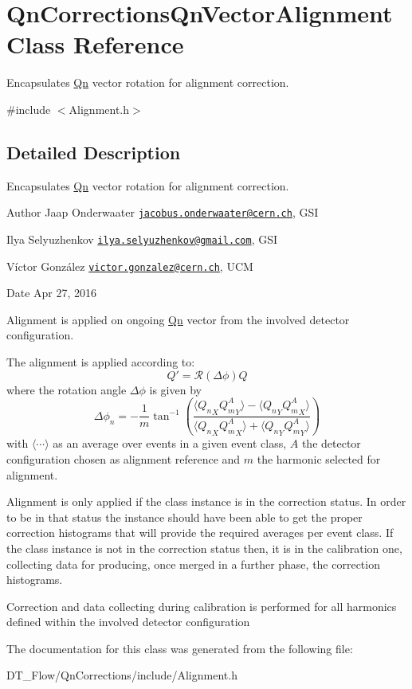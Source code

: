 \hypertarget{classQnCorrectionsQnVectorAlignment}{}\section{Qn\+Corrections\+Qn\+Vector\+Alignment Class Reference}
\label{classQnCorrectionsQnVectorAlignment}


Encapsulates \mbox{\hyperlink{namespaceQn}{Qn}} vector rotation for alignment correction.  




{\ttfamily \#include $<$Alignment.\+h$>$}



\subsection{Detailed Description}
Encapsulates \mbox{\hyperlink{namespaceQn}{Qn}} vector rotation for alignment correction. 

\begin{DoxyAuthor}{Author}
Jaap Onderwaater \href{mailto:jacobus.onderwaater@cern.ch}{\tt jacobus.\+onderwaater@cern.\+ch}, G\+SI 

Ilya Selyuzhenkov \href{mailto:ilya.selyuzhenkov@gmail.com}{\tt ilya.\+selyuzhenkov@gmail.\+com}, G\+SI 

Víctor González \href{mailto:victor.gonzalez@cern.ch}{\tt victor.\+gonzalez@cern.\+ch}, U\+CM 
\end{DoxyAuthor}
\begin{DoxyDate}{Date}
Apr 27, 2016
\end{DoxyDate}
Alignment is applied on ongoing \mbox{\hyperlink{namespaceQn}{Qn}} vector from the involved detector configuration.

The alignment is applied according to\+: \[ Q' = \mathcal{R}(\Delta \phi) Q \] where the rotation angle $ \Delta \phi $ is given by \[ \Delta \phi_n = - \frac{1}{m} \tan^{-1} \left(\frac{\langle{Q_n}_X{Q^A_m}_Y\rangle - \langle{Q_n}_Y{Q^A_m}_X\rangle} {\langle{Q_n}_X{Q^A_m}_X\rangle + \langle{Q_n}_Y{Q^A_m}_Y\rangle}\right) \] with $ \langle \cdots \rangle $ as an average over events in a given event class, $ A $ the detector configuration chosen as alignment reference and $ m $ the harmonic selected for alignment.

Alignment is only applied if the class instance is in the correction status. In order to be in that status the instance should have been able to get the proper correction histograms that will provide the required averages per event class. If the class instance is not in the correction status then, it is in the calibration one, collecting data for producing, once merged in a further phase, the correction histograms.

Correction and data collecting during calibration is performed for all harmonics defined within the involved detector configuration 

The documentation for this class was generated from the following file\+:\begin{DoxyCompactItemize}
\item 
D\+T\+\_\+\+Flow/\+Qn\+Corrections/include/Alignment.\+h\end{DoxyCompactItemize}

